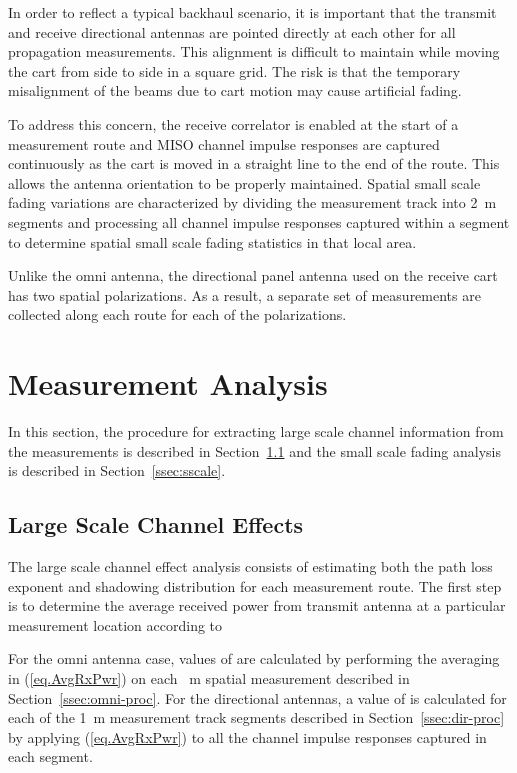 \documentclass[12pt]{IEEEtran}
\newcommand{\NoI}{\noindent}
\begin{document}
In order to reflect a typical backhaul scenario, it is important that the transmit and receive directional antennas are pointed directly at each other for all propagation measurements.  This alignment is difficult to maintain while moving the cart from side to side in a square grid.  The risk is that the temporary misalignment of the beams due to cart motion may cause artificial fading.

To address this concern, the receive correlator is enabled at the start of a measurement route and MISO channel impulse responses are captured continuously as the cart is moved in a straight line to the end of the route.  This allows the antenna orientation to be properly maintained.  Spatial small scale fading variations are characterized by dividing the measurement track into 2~m segments and processing all channel impulse responses captured within a segment to determine spatial small scale fading statistics in that local area. 

Unlike the omni antenna, the directional panel antenna used on the receive cart has two spatial polarizations.  As a result, a separate set of measurements are collected along each route for each of the polarizations.


\section{Measurement Analysis}
\label{sec:analysis}

In this section, the procedure for extracting large scale channel information from the measurements is described in Section~\ref{ssec:lscale} and the small scale fading analysis is described in Section~\ref{ssec:sscale}.


\subsection{Large Scale Channel Effects}
\label{ssec:lscale}

The large scale channel effect analysis consists of estimating both the path loss exponent and shadowing distribution for each measurement route.  The first step is to determine the average received power from transmit antenna  at a particular measurement location according to



\NoI
For the omni antenna case, values of  are calculated by performing the averaging in (\ref{eq.AvgRxPwr}) on each ~m spatial measurement described in Section~\ref{ssec:omni-proc}.  For the directional antennas, a value of  is calculated for each of the 1~m measurement track segments described in Section~\ref{ssec:dir-proc} by applying (\ref{eq.AvgRxPwr}) to all the channel impulse responses captured in each segment.
\end{document}

